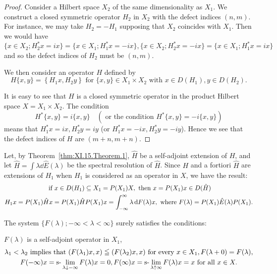 \begin{proof}
 Consider a Hilbert space $X_{2}$ of the same dimensionality as $X_{1}$. We construct a closed symmetric operator $H_{2}$ in $X_{2}$ with the defect indices $(n, m)$. For instance, we may take $H_{2} = -H_{1}$ supposing that $X_{2}$ coincides with $X_{1}$. Then we would have $\{x \in X_{2}; H_{2}^{*}x = ix\} = \{x \in X_{1}; H_{1}^{*}x = -ix\}, \{x \in X_{2}; H_{2}^{*}x = -ix\} = \{x \in X_{1}; H_{1}^{*}x = ix\}$ and so the defect indices of $H_{2}$ must be $(n, m)$. 

We then consider an operator $H$ defined by 
\[
H \{x, y \} = \left\{H _{1} x, H _{2} y \right\} \text{ for } \{x, y \} \in X _{1} \times X _{2} \text{ with } x \in D (H _{1}), y \in D (H _{2}).
\]

It is easy to see that $H$ is a closed symmetric operator in the product Hilbert space $X = X_{1} \times X_{2}$. The condition 
\[
H ^{*} \{x, y \} = i \{x, y \} \quad (\text{ or the condition } H ^{*} \{x, y \} = - i \{x, y \})
\]
means that $H_1^* x = ix, H_2^* y = iy$ (or $H_1^* x = -ix, H_2^* y = -iy$). Hence we see that the defect indices of $H$ are $(m + n, m + n)$. 
\end{proof}

\begin{corollaryu} Let, by Theorem~\ref{thm:XI.15.Theorem.1}, $\hat{H}$ be a self-adjoint extension of $H$, and let $\hat{H} = \int \lambda \dd\hat{E} (\lambda)$ be the spectral resolution of $\hat{H}$. Since $H$ and a fortiori $\hat{H}$ are extensions of $H_{1}$ when $H_{1}$ is considered as an operator in $X$, we have the result: 
\begin{gather}\text{ if } x \in D (H _{1}) \subseteq X _{1} = P (X _{1}) X, \text{ then } x = P (X _{1}) x \in D (\hat {H}) \notag \\H _{1} x = P (X _{1}) \hat {H} x = P (X _{1}) \hat {H} P (X _{1}) x = \int_{- \infty} ^{\infty} \lambda \mathop{}\!\mathrm{d} F (\lambda) x, \text{ where } F (\lambda) = P (X _{1}) \hat {E} (\lambda) P (X _{1}). \label{eq:XI.15.3}
\end{gather}
\end{corollaryu}

The system $\{F(\lambda); -\infty < \lambda < \infty\}$ surely satisfies the conditions: 

$F(\lambda)$ is a self-adjoint operator in $X_{1}$, 
\begin{gather}\lambda_{1} < \lambda_{2} \text{ implies that } (F (\lambda_{1}) x, x) \leqq (F (\lambda_{2}) x, x) \text{ for every } x \in X _{1}, F (\lambda + 0) = F (\lambda), \label{eq:XI.15.4} \\F (- \infty) x = \text{s-}\lim _{\lambda \downarrow - \infty} F (\lambda) x = 0, F (\infty) x = \text{s-}\lim _{\lambda \uparrow \infty} F (\lambda) x = x \text{ for all } x \in X. \notag
\end{gather}

